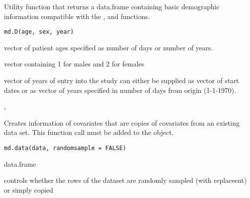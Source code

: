\documentclass[a4paper]{book}
\begin{document}
%
\begin{Description}\relax
Utility function that returns a data.frame containing basic demographic
information compatible with the ,
 and  functions.
\end{Description}
%
\begin{Usage}
\begin{verbatim}
md.D(age, sex, year)
\end{verbatim}
\end{Usage}
%
\begin{Arguments}
\begin{ldescription}
\item[\code{age}] vector of patient ages specified as number of days or number of years.

\item[\code{sex}] vector containing 1 for males and 2 for females

\item[\code{year}] vector of years of entry into the study can either be supplied 
as vector of start dates or as vector of years specified in number of days from origin (1-1-1970).
\end{ldescription}
\end{Arguments}
%
\begin{SeeAlso}\relax
{}, 
\end{SeeAlso}
%
\begin{Description}\relax
Creates information of covariates that are copies of covariates from an existing data set.
This function call must be added to the  object.
\end{Description}
%
\begin{Usage}
\begin{verbatim}
md.data(data, randomsample = FALSE)
\end{verbatim}
\end{Usage}
%
\begin{Arguments}
\begin{ldescription}
\item[\code{data}] data.frame

\item[\code{randomsample}] controls whether the rows of the dataset are randomly sampled (with replaceent) or simply copied
\end{ldescription}
\end{Arguments}
\end{document}
